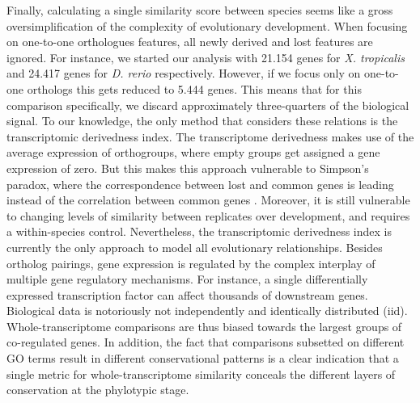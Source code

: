 Finally, calculating a single similarity score between species seems like a gross oversimplification of the complexity of evolutionary development. When focusing on one-to-one orthologues features, all newly derived and lost features are ignored. For instance, we started our analysis with 21.154 genes for \textit{X. tropicalis} and 24.417 genes for \textit{D. rerio} respectively. However, if we focus only on one-to-one orthologs this gets reduced to 5.444 genes. This means that for this comparison specifically, we discard approximately three-quarters of the biological signal. To our knowledge, the only method that considers these relations is the transcriptomic derivedness index\cite{Leong2021}. The transcriptome derivedness makes use of the average expression of orthogroups, where empty groups get assigned a gene expression of zero. But this makes this approach vulnerable to Simpson's paradox, where the correspondence between lost and common genes is leading instead of the correlation between common genes \cite{Saccenti2023}. Moreover, it is still vulnerable to changing levels of similarity between replicates over development, and requires a within-species control. Nevertheless, the transcriptomic derivedness index is currently the only approach to model all evolutionary relationships. Besides ortholog pairings, gene expression is regulated by the complex interplay of multiple gene regulatory mechanisms. For instance, a single differentially expressed transcription factor can affect thousands of downstream genes. Biological data is notoriously not independently and identically distributed (iid). Whole-transcriptome comparisons are thus biased towards the largest groups of co-regulated genes. In addition, the fact that comparisons subsetted on different GO terms result in different conservational patterns is a clear indication that a single metric for whole-transcriptome similarity conceals the different layers of conservation at the phylotypic stage\cite{Malik2017,Gildor2019,Onimaru2021}.

